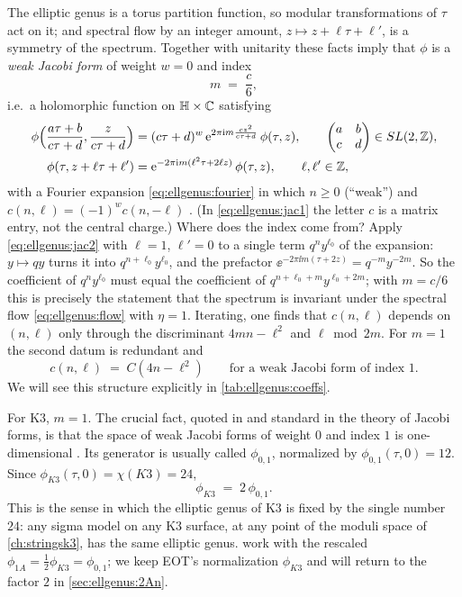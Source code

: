 The elliptic genus is a torus partition function, so modular transformations of $\tau$ act
on it; and spectral flow by an integer amount, $z\mapsto z+\ell\tau+\ell'$, is a symmetry of
the spectrum. Together with unitarity these facts imply  that
$\phi$ is a \emph{weak Jacobi form} of weight $w=0$ and index
\begin{equation}\label{eq:ellgenus:index}
 m\;=\;\frac c6 ,
\end{equation}
i.e.\ a holomorphic function on $\mathbb H\times\mathbb{C}$ satisfying
\begin{align}
 \phi\Big(\frac{a\tau+b}{c\tau+d},\frac z{c\tau+d}\Big)
   &= (c\tau+d)^w\,\mathrm{e}^{2\pi\mathrm{i} m\frac{cz^2}{c\tau+d}}\,\phi(\tau,z),
   \qquad \begin{pmatrix}a&b\\c&d\end{pmatrix}\in SL(2,\mathbb{Z}),\label{eq:ellgenus:jac1}\\
 \phi(\tau,z+\ell\tau+\ell')&=\mathrm{e}^{-2\pi\mathrm{i} m(\ell^2\tau+2\ell z)}\,\phi(\tau,z),
   \qquad \ell,\ell'\in\mathbb{Z},\label{eq:ellgenus:jac2}
\end{align}
with a Fourier expansion \eqref{eq:ellgenus:fourier} in which $n\ge0$ (``weak'') and
$c(n,\ell)=(-1)^wc(n,-\ell)$ . (In
\eqref{eq:ellgenus:jac1} the letter $c$ is a matrix entry, not the central charge.) Where does
the index come from? Apply \eqref{eq:ellgenus:jac2} with $\ell=1$, $\ell'=0$ to a single term
$q^ny^{\ell_0}$ of the expansion: $y\mapsto qy$ turns it into $q^{n+\ell_0}y^{\ell_0}$, and the
prefactor $\ee^{-2\pi\ii m(\tau+2z)}=q^{-m}y^{-2m}$. So the coefficient of $q^{n}y^{\ell_0}$
must equal the coefficient of $q^{n+\ell_0+m}y^{\ell_0+2m}$; with $m=c/6$ this is precisely
the statement that the spectrum is invariant under the spectral flow
\eqref{eq:ellgenus:flow} with $\eta=1$. Iterating, one finds that $c(n,\ell)$ depends on
$(n,\ell)$ only through the discriminant $4mn-\ell^2$ and $\ell \bmod 2m$. For $m=1$ the
second datum is redundant and
\begin{equation}\label{eq:ellgenus:disc}
 c(n,\ell)\;=\;C(4n-\ell^2)\qquad\text{for a weak Jacobi form of index }1.
\end{equation}
We will see this structure explicitly in \cref{tab:ellgenus:coeffs}.

For K3, $m=1$. The crucial fact, quoted in  and standard in the
theory of Jacobi forms, is that the space of weak Jacobi forms of weight $0$ and index $1$ is
one-dimensional \TL. Its generator is usually called $\phi_{0,1}$, normalized by
$\phi_{0,1}(\tau,0)=12$. Since $\phi_{K3}(\tau,0)=\chi(K3)=24$,
\begin{equation}\label{eq:ellgenus:phi01}
 \phi_{K3}\;=\;2\,\phi_{0,1}.
\end{equation}
This is the sense in which the elliptic genus of K3 is fixed by the single number $24$: any
sigma model on any K3 surface, at any point of the moduli space of \cref{ch:stringsk3}, has
the same elliptic genus.  work with the rescaled
$\phi_{1A}=\tfrac12\phi_{K3}=\phi_{0,1}$; we keep EOT's normalization $\phi_{K3}$ and will
return to the factor $2$ in \cref{sec:ellgenus:2An}.

